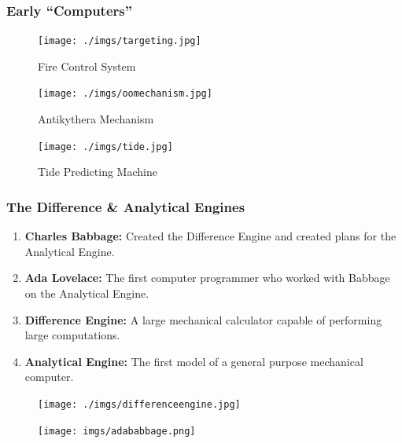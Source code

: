 \documentclass{beamer}
\begin{document}
%
%
\begin{frame}
  \frametitle{Early ``Computers''}
  \begin{minipage}{0.49\textwidth}
    \begin{figure}
      \texttt{[image: ./imgs/targeting.jpg]}
      \label{fig:target}
      \caption{Fire Control System}
    \end{figure}
    \begin{figure}
      \texttt{[image: ./imgs/oomechanism.jpg]}
      \label{fig:oomechanism}
      \caption{Antikythera Mechanism}
    \end{figure}
  \end{minipage}
  \begin{minipage}{0.49\textwidth}
    \begin{figure}
      \texttt{[image: ./imgs/tide.jpg]}
      \label{fig:tide}
      \caption{Tide Predicting Machine}
    \end{figure}
  \end{minipage}
\end{frame}

%
%
\begin{frame}
  \frametitle{The Difference \& Analytical Engines}
  \begin{minipage}{0.59\textwidth}
    \begin{enumerate}
      \item \textbf{Charles Babbage: } Created the Difference Engine and created plans for the Analytical Engine.
      \item \textbf{Ada Lovelace: } The first computer programmer who worked with Babbage on the Analytical Engine.
      \item \textbf{Difference Engine: } A large mechanical calculator capable of performing large computations.
      \item \textbf{Analytical Engine: } The first model of a general purpose mechanical computer.
    \end{enumerate}
    \hfill
  \end{minipage}
  \begin{minipage}{0.39\textwidth}
    \centering
    \begin{figure}
      \texttt{[image: ./imgs/differenceengine.jpg]}
      \label{fig:analyticalengine.png}
    \end{figure}
    \begin{figure}
      \texttt{[image: imgs/adababbage.png]}
      \label{fig:adababbage.png}
    \end{figure}
  \end{minipage}
\end{frame}
\end{document}
